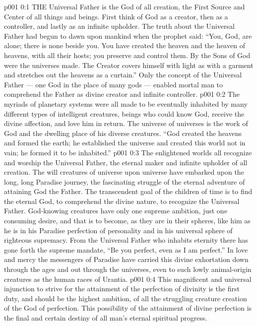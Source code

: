 \vs p001 0:1 THE Universal Father is the God of all creation, the First Source and Center of all things and beings. First think of God as a creator, then as a controller, and lastly as an infinite upholder. The truth about the Universal Father had begun to dawn upon mankind when the prophet said: “You, God, are alone; there is none beside you. You have created the heaven and the heaven of heavens, with all their hosts; you preserve and control them. By the Sons of God were the universes made. The Creator covers himself with light as with a garment and stretches out the heavens as a curtain.” Only the concept of the Universal Father --- one God in the place of many gods --- enabled mortal man to comprehend the Father as divine creator and infinite controller.
\vs p001 0:2 The myriads of planetary systems were all made to be eventually inhabited by many different types of intelligent creatures, beings who could know God, receive the divine affection, and love him in return. The universe of universes is the work of God and the dwelling place of his diverse creatures. “God created the heavens and formed the earth; he established the universe and created this world not in vain; he formed it to be inhabited.”
\vs p001 0:3 The enlightened worlds all recognize and worship the Universal Father, the eternal maker and infinite upholder of all creation. The will creatures of universe upon universe have embarked upon the long, long Paradise journey, the fascinating struggle of the eternal adventure of attaining God the Father. The transcendent goal of the children of time is to find the eternal God, to comprehend the divine nature, to recognize the Universal Father. God\hyp{}knowing creatures have only one supreme ambition, just one consuming desire, and that is to become, as they are in their spheres, like him as he is in his Paradise perfection of personality and in his universal sphere of righteous supremacy. From the Universal Father who inhabits eternity there has gone forth the supreme mandate, “Be you perfect, even as I am perfect.” In love and mercy the messengers of Paradise have carried this divine exhortation down through the ages and out through the universes, even to such lowly animal\hyp{}origin creatures as the human races of Urantia.
\vs p001 0:4 This magnificent and universal injunction to strive for the attainment of the perfection of divinity is the first duty, and should be the highest ambition, of all the struggling creature creation of the God of perfection. This possibility of the attainment of divine perfection is the final and certain destiny of all man’s eternal spiritual progress.

